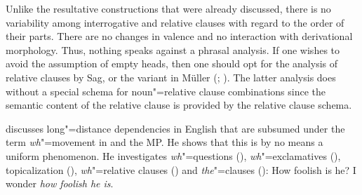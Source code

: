 \begin{exe}
\begin{xlist}[iv.]
\begin{exe}
\begin{xlist}[iv.]
Unlike the resultative constructions that were already discussed, there is no variability among interrogative and relative clauses with regard to the order of
their parts. There are no changes in valence and no interaction with derivational morphology. Thus, nothing speaks against a phrasal
analysis.
If one wishes to avoid the assumption of empty heads, then one should opt for the analysis of relative clauses 
by Sag, or the variant in Müller (\citeyear[Chapter~10]{Mueller99a}; \citeyear[Chapter~11]{MuellerLehrbuch1}). The latter analysis does without a special schema
for noun"=relative clause combinations since the semantic content of the relative clause is provided by the relative clause
schema.%

\citet{Sag2010b} discusses long"=distance dependencies in English that are subsumed
under the term \emph{wh}"=movement in \gbt and the MP\indexmp. He shows that this is by no means a
uniform phenomenon.  He investigates \emph{wh}"=questions (),
\emph{wh}"=exclamatives (),
topicalization (), \emph{wh}"=relative clauses
() and \emph{the}"=clauses ():
\eal
\ex How foolish is he?
\ex I wonder \emph{how foolish he is}.
\zl


\end{xlist}
\end{exe}
\end{xlist}
\end{exe}
